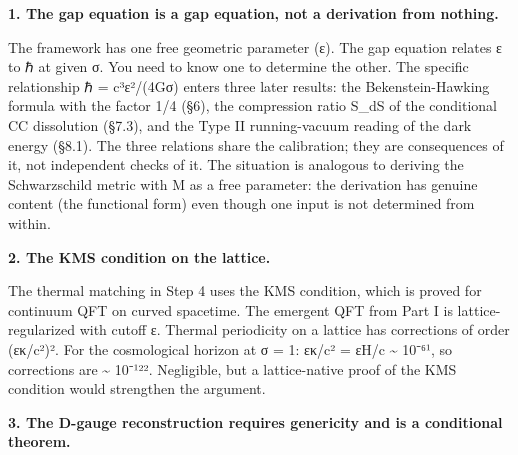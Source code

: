 \documentclass[
]{article}
\begin{document}
\textbf{1. The gap equation is a gap equation, not a derivation from
nothing.}

The framework has one free geometric parameter (ε). The gap equation
relates ε to ℏ at given σ. You need to know one to determine the other.
The specific relationship ℏ = c³ε²/(4Gσ) enters three later results: the
Bekenstein-Hawking formula with the factor 1/4 (§6), the compression
ratio S\_dS of the conditional CC dissolution (§7.3), and the Type II
running-vacuum reading of the dark energy (§8.1). The three relations
share the calibration; they are consequences of it, not independent
checks of it. The situation is analogous to deriving the Schwarzschild
metric with M as a free parameter: the derivation has genuine content
(the functional form) even though one input is not determined from
within.

\textbf{2. The KMS condition on the lattice.}

The thermal matching in Step 4 uses the KMS condition, which is proved
for continuum QFT on curved spacetime. The emergent QFT from Part I is
lattice-regularized with cutoff ε. Thermal periodicity on a lattice has
corrections of order (εκ/c²)². For the cosmological horizon at σ = 1:
εκ/c² = εH/c \textasciitilde{} 10⁻⁶¹, so corrections are
\textasciitilde{} 10⁻¹²². Negligible, but a lattice-native proof of the
KMS condition would strengthen the argument.

\textbf{3. The D-gauge reconstruction requires genericity and is a
conditional theorem.}
\end{document}
